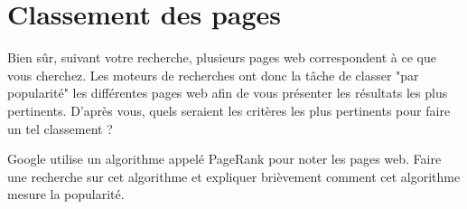 \documentclass{article}
\begin{document}
\section{Classement des pages}
Bien sûr, suivant votre recherche, plusieurs pages web correspondent à ce que vous cherchez. Les moteurs de recherches ont donc la tâche de classer "par popularité" les différentes pages web afin de vous présenter les résultats les plus pertinents. D'après vous, quels seraient les critères les plus pertinents pour faire un tel classement ?

Google utilise un algorithme appelé PageRank pour noter les pages web. Faire une recherche sur cet algorithme et expliquer brièvement comment cet algorithme mesure la popularité.
\end{document}
